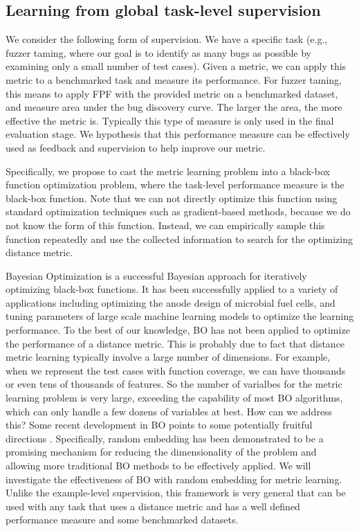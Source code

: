 \subsection{Learning from global task-level supervision}
We consider the following form of supervision. We have a specific task (e.g., fuzzer taming, where our goal is to identify as many bugs as possible by examining only a small number of test cases). Given a metric, we can apply this metric to a benchmarked task and measure its performance. For fuzzer taming, this means to apply FPF with the provided metric on a benchmarked dataset, and measure area under the bug discovery curve. The larger the area, the more effective the metric is. Typically this type of measure is only used in the final evaluation stage. We hypothesis that this performance measure can be effectively used as feedback and supervision to help improve our metric. 

Specifically, we propose to cast the metric learning problem into a black-box function optimization problem, where the task-level performance measure is the black-box function. Note that we can not directly optimize this function using standard optimization techniques such as gradient-based methods, because we do not know the form of this function. Instead, we can empirically sample this function repeatedly and use the collected information to search for the optimizing distance metric. 

Bayesian Optimization is a successful Bayesian approach for iteratively optimizing black-box functions. It has been successfully applied to a variety of applications including optimizing the anode design of microbial fuel cells, and tuning parameters of large scale machine learning models to optimize the learning performance. To the best of our knowledge, BO has not been applied to optimize the performance of a distance metric.  This is probably due to fact that distance metric learning typically involve a large number of dimensions. For example, when we represent the test cases with function coverage, we can have thousands or even tens of thousands of features. So the number of varialbes for the metric learning problem is very large, exceeding the capability of most BO algorithms, which can only handle a few dozens of variables at best. How can we address this? Some recent development in BO points to some potentially fruitful directions \cite{nando's 2013 paper}. Specifically, random embedding has been demonstrated to be a promising mechanism for reducing the dimensionality of the problem and allowing more traditional BO methods to be effectively applied. We will investigate the effectiveness of BO with random embedding for metric learning. Unlike the example-level supervision, this framework is very general that can be used with any task that uses a distance metric and has a well defined performance measure and some benchmarked datasets. 